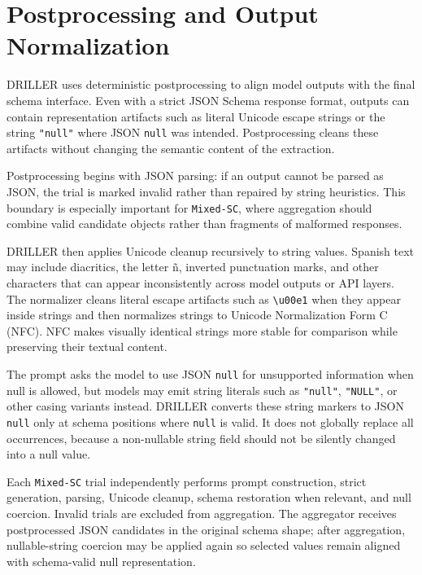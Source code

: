 \section{Postprocessing and Output Normalization}

DRILLER uses deterministic postprocessing to align model outputs with the final schema interface. Even with a strict JSON Schema response format, outputs can contain representation artifacts such as literal Unicode escape strings or the string \texttt{"null"} where JSON \texttt{null} was intended. Postprocessing cleans these artifacts without changing the semantic content of the extraction.

Postprocessing begins with JSON parsing: if an output cannot be parsed as JSON, the trial is marked invalid rather than repaired by string heuristics. This boundary is especially important for \texttt{Mixed-SC}, where aggregation should combine valid candidate objects rather than fragments of malformed responses.

DRILLER then applies Unicode cleanup recursively to string values. Spanish text may include diacritics, the letter ñ, inverted punctuation marks, and other characters that can appear inconsistently across model outputs or API layers. The normalizer cleans literal escape artifacts such as \texttt{\textbackslash u00e1} when they appear inside strings and then normalizes strings to Unicode Normalization Form C (NFC). NFC makes visually identical strings more stable for comparison while preserving their textual content.

The prompt asks the model to use JSON \texttt{null} for unsupported information when null is allowed, but models may emit string literals such as \texttt{"null"}, \texttt{"NULL"}, or other casing variants instead. DRILLER converts these string markers to JSON \texttt{null} only at schema positions where \texttt{null} is valid. It does not globally replace all occurrences, because a non-nullable string field should not be silently changed into a null value.

Each \texttt{Mixed-SC} trial independently performs prompt construction, strict generation, parsing, Unicode cleanup, schema restoration when relevant, and null coercion. Invalid trials are excluded from aggregation. The aggregator receives postprocessed JSON candidates in the original schema shape; after aggregation, nullable-string coercion may be applied again so selected values remain aligned with schema-valid null representation.
